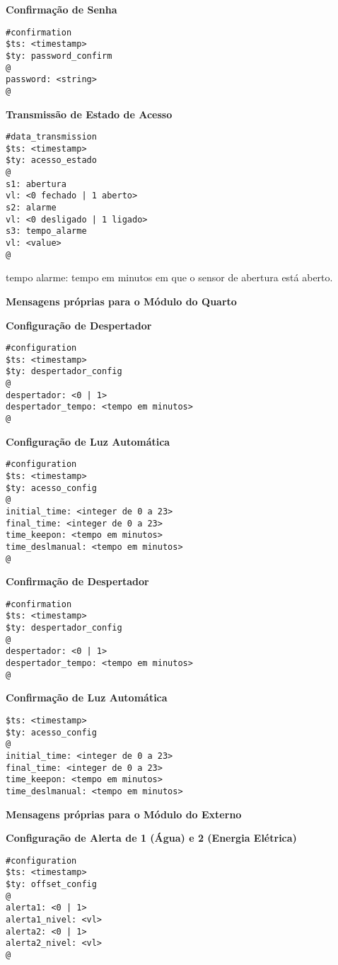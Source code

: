 \textbf{Confirmação de Senha}
\begin{lstlisting}
#confirmation
$ts: <timestamp>
$ty: password_confirm
@
password: <string>
@
\end{lstlisting}

\textbf{Transmissão de Estado de Acesso}
\begin{lstlisting}
#data_transmission
$ts: <timestamp>
$ty: acesso_estado
@
s1: abertura
vl: <0 fechado | 1 aberto>
s2: alarme
vl: <0 desligado | 1 ligado>
s3: tempo_alarme
vl: <value>
@
\end{lstlisting}

tempo alarme: tempo em minutos em que o sensor de abertura está aberto.

\textbf{Mensagens próprias para o Módulo do Quarto}

\textbf{Configuração de Despertador}
\begin{lstlisting}
#configuration
$ts: <timestamp>
$ty: despertador_config
@
despertador: <0 | 1>
despertador_tempo: <tempo em minutos>
@
\end{lstlisting}

\textbf{Configuração de Luz Automática}
\begin{lstlisting}
#configuration
$ts: <timestamp>
$ty: acesso_config
@
initial_time: <integer de 0 a 23>
final_time: <integer de 0 a 23>
time_keepon: <tempo em minutos>
time_deslmanual: <tempo em minutos>
@
\end{lstlisting}

\textbf{Confirmação de Despertador}
\begin{lstlisting}
#confirmation
$ts: <timestamp>
$ty: despertador_config
@
despertador: <0 | 1>
despertador_tempo: <tempo em minutos>
@
\end{lstlisting}

\textbf{Confirmação de Luz Automática}
\begin{lstlisting}
$ts: <timestamp>
$ty: acesso_config
@
initial_time: <integer de 0 a 23>
final_time: <integer de 0 a 23>
time_keepon: <tempo em minutos>
time_deslmanual: <tempo em minutos>
\end{lstlisting}

\textbf{Mensagens próprias para o Módulo do Externo}

\textbf{Configuração de Alerta de 1 (Água) e 2 (Energia Elétrica)}
\begin{lstlisting}
#configuration
$ts: <timestamp>
$ty: offset_config
@
alerta1: <0 | 1>
alerta1_nivel: <vl>
alerta2: <0 | 1>
alerta2_nivel: <vl>
@
\end{lstlisting}

